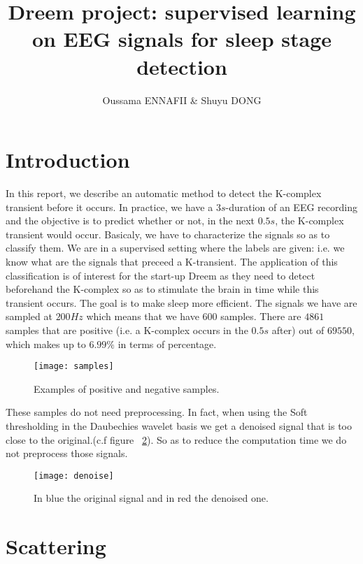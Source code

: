 \documentclass[onecolumn,12pt]{article}
\author{Oussama ENNAFII & Shuyu DONG}
\title{Dreem project: supervised learning on EEG signals for sleep stage detection}
\begin{document}
\maketitle
	
\section{Introduction}

	In this report, we describe an automatic method to detect the K-complex transient before it occurs. In practice, we have a $3s$-duration of an EEG recording and the objective is to predict whether or not, in the next $0.5s$, the K-complex transient would occur. Basicaly, we have to characterize the signals so as to classify them. We are in a supervised setting where the labels are given: i.e. we know what are the signals that preceed a K-transient. The application of this classification is of interest for the start-up Dreem as they need to detect beforehand the K-complex so as to stimulate the brain in time while this transient occurs. The goal is to make sleep more efficient. The signals we have are sampled at $200 Hz$ which means that we have $600$ samples. There are $4861$ samples that are positive (i.e. a K-complex occurs in the $0.5s$ after) out of $ 69550$, which makes up to $6.99\%$ in terms of percentage.\\
	
	\begin{figure}
		\centering
		\texttt{[image: samples]}
		\caption{\label{fig:samples} Examples of positive and negative samples.}
	\end{figure}
	
	These samples do not need preprocessing. In fact, when using the Soft thresholding in the Daubechies wavelet basis we get a denoised signal that is too close to the original.(c.f figure ~\ref{fig:denoising}). So as to reduce the computation time we do not preprocess those signals.\\
	
	\begin{figure}
		\centering
		\texttt{[image: denoise]}
		\caption{\label{fig:denoising} In blue the original signal and in red the denoised one.}
	\end{figure}
	
	\section{Scattering}
	
\end{document}

